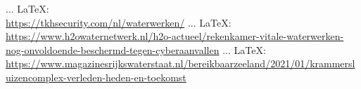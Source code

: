 \begin{thebibliography}{99}
{{{{ ... \LaTeX:\\ \url{https://tkhsecurity.com/nl/waterwerken/}
 ... \LaTeX:\\ \url{https://www.h2owaternetwerk.nl/h2o-actueel/rekenkamer-vitale-waterwerken-nog-onvoldoende-beschermd-tegen-cyberaanvallen}
 ... \LaTeX:\\ \url{https://www.magazinesrijkswaterstaat.nl/bereikbaarzeeland/2021/01/krammersluizencomplex-verleden-heden-en-toekomst}



%
%
%



}}}}
\end{thebibliography}

